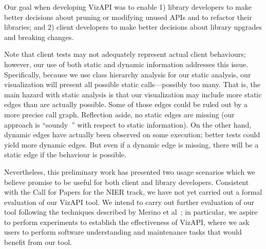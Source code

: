 \label{sec:discussion}
Our goal when developing VizAPI was to enable 1) library developers to make better
decisions about pruning or modifying unused APIs and to refactor their
libraries; and 2) client developers to make better decisions about library
upgrades and breaking changes.


Note that client tests may
not adequately represent actual client behaviours; however, our use of both static
and dynamic information addresses this issue. Specifically, because we use
class hierarchy analysis for our static analysis, our visualization will present
all possible static calls---possibly too many. 
That is, the main hazard with static analysis is that our visualization may include more
static edges than are actually possible. Some of those edges could be ruled out by a more
precise call graph. Reflection aside, no static edges
are missing (our approach is ``soundy~\cite{livshits15:_in_defen_sound}'' with respect to static information). On the other hand, dynamic edges have actually been observed
on some execution; better tests could yield more dynamic edges. But even if
a dynamic edge is missing, there will be a static edge if the behaviour is possible.

Nevertheless, this preliminary work has presented two usage scenarios which we
believe promise to be useful for both client and library
developers. Consistent with the Call for Papers for the NIER track, we
have not yet carried out a formal evaluation of our VizAPI tool. We
intend to carry out further evaluation of our tool following the
techniques described by Merino et
al~\cite{merino18:_system_liter_review_softw_visual_evaluat}; in
particular, we aspire to perform experiments to establish the
effectiveness of VizAPI, where we ask users to perform software
understanding and maintenance tasks that would benefit from our tool.


